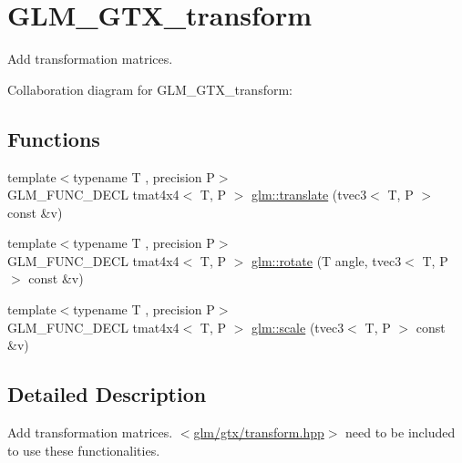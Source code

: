 \hypertarget{group__gtx__transform}{\section{G\-L\-M\-\_\-\-G\-T\-X\-\_\-transform}
\label{group__gtx__transform}
}


Add transformation matrices.  


Collaboration diagram for G\-L\-M\-\_\-\-G\-T\-X\-\_\-transform\-:
\subsection*{Functions}
\begin{DoxyCompactItemize}
\item 
{\footnotesize template$<$typename T , precision P$>$ }\\G\-L\-M\-\_\-\-F\-U\-N\-C\-\_\-\-D\-E\-C\-L tmat4x4$<$ T, P $>$ \hyperlink{group__gtx__transform_ga838c4505ef7f254ed05117b1ac9691fb}{glm\-::translate} (tvec3$<$ T, P $>$ const \&v)
\item 
{\footnotesize template$<$typename T , precision P$>$ }\\G\-L\-M\-\_\-\-F\-U\-N\-C\-\_\-\-D\-E\-C\-L tmat4x4$<$ T, P $>$ \hyperlink{group__gtx__transform_ga2020c91bf61e050882b3a5c18eada700}{glm\-::rotate} (T angle, tvec3$<$ T, P $>$ const \&v)
\item 
{\footnotesize template$<$typename T , precision P$>$ }\\G\-L\-M\-\_\-\-F\-U\-N\-C\-\_\-\-D\-E\-C\-L tmat4x4$<$ T, P $>$ \hyperlink{group__gtx__transform_ga1972d4a66a2e92637c8aaee598417a71}{glm\-::scale} (tvec3$<$ T, P $>$ const \&v)
\end{DoxyCompactItemize}


\subsection{Detailed Description}
Add transformation matrices. $<$\hyperlink{transform_8hpp}{glm/gtx/transform.\-hpp}$>$ need to be included to use these functionalities. 


